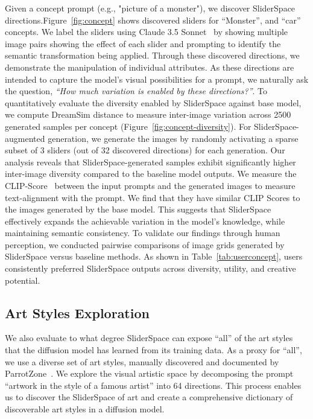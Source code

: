 Given a concept prompt (e.g., "picture of a monster"), we discover SliderSpace directions.Figure~\ref{fig:concept} shows discovered sliders for ``Monster'', and ``car'' concepts. We label the sliders using Claude 3.5 Sonnet~\cite{claude} by showing multiple image pairs showing the effect of each slider and prompting to identify the semantic transformation being applied. Through these discovered directions, we demonstrate the manipulation of individual attributes. As these directions are intended to capture the model's visual possibilities for a prompt, we naturally ask the question, \textit{``How much variation is enabled by these directions?''}. To quantitatively evaluate the diversity enabled by SliderSpace against base model, we compute DreamSim \cite{dreamsim} distance to measure inter-image variation across 2500 generated samples per concept  (Figure~\ref{fig:concept-diversity}). For SliderSpace-augmented generation, we generate the images by randomly activating a sparse subset of 3 sliders (out of 32 discovered directions) for each generation. Our analysis reveals that SliderSpace-generated samples exhibit significantly higher inter-image diversity compared to the baseline model outputs. We measure the CLIP-Score~\cite{hessel2021clipscore} between the input prompts and the generated images to measure text-alignment with the prompt. We find that they have similar CLIP Scores to the images generated by the base model. This suggests that SliderSpace effectively expands the achievable variation in the model's knowledge, while maintaining semantic consistency. To validate our findings through human perception, we conducted pairwise comparisons of image grids generated by SliderSpace versus baseline methods. As shown in Table~\ref{tab:userconcept}, users consistently preferred SliderSpace outputs across diversity, utility, and creative potential.




%

\subsection{Art Styles Exploration} \label{sec:art_exp}
We also evaluate to what degree SliderSpace can expose ``all'' of the art styles that the diffusion model has learned from its training data. As a proxy for ``all'', we use a diverse set of art styles, manually discovered and documented by ParrotZone~\cite{parrotzone}. We explore the visual artistic space by decomposing the prompt ``artwork in the style of a famous artist'' into 64 directions. This process enables us to discover the SliderSpace of art and create a comprehensive dictionary of discoverable art styles in a diffusion model.

